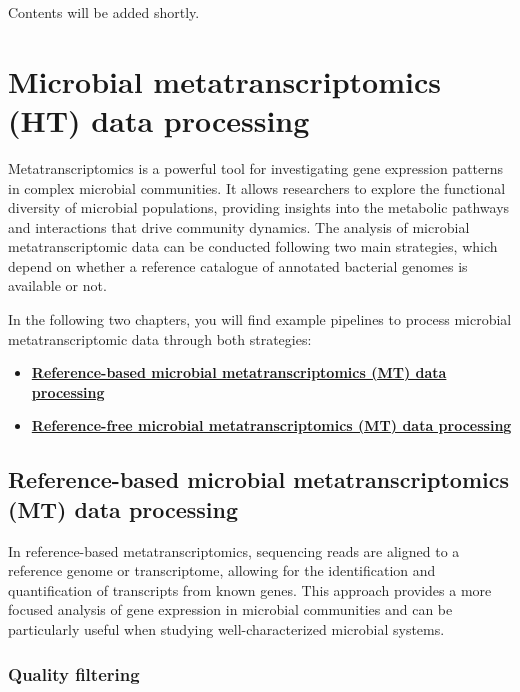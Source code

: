 \documentclass[
]{book}
\providecommand{\tightlist}{%
  \setlength{\itemsep}{0pt}\setlength{\parskip}{0pt}}
\begin{document}
Contents will be added shortly.

\hypertarget{microbial-metatranscriptomics-data-processing}{%
\chapter{Microbial metatranscriptomics (HT) data processing}\label{microbial-metatranscriptomics-data-processing}}

Metatranscriptomics is a powerful tool for investigating gene expression patterns in complex microbial communities. It allows researchers to explore the functional diversity of microbial populations, providing insights into the metabolic pathways and interactions that drive community dynamics. The analysis of microbial metatranscriptomic data can be conducted following two main strategies, which depend on whether a reference catalogue of annotated bacterial genomes is available or not.

In the following two chapters, you will find example pipelines to process microbial metatranscriptomic data through both strategies:

\begin{itemize}
\tightlist
\item
  \textbf{\protect\hyperlink{microbial-metatranscriptomics-data-processing-reference-based}{Reference-based microbial metatranscriptomics (MT) data processing}}
\item
  \textbf{\protect\hyperlink{microbial-metatranscriptomics-data-processing-reference-free}{Reference-free microbial metatranscriptomics (MT) data processing}}
\end{itemize}

\hypertarget{microbial-metatranscriptomics-data-processing-reference-based}{%
\section{Reference-based microbial metatranscriptomics (MT) data processing}\label{microbial-metatranscriptomics-data-processing-reference-based}}

In reference-based metatranscriptomics, sequencing reads are aligned to a reference genome or transcriptome, allowing for the identification and quantification of transcripts from known genes. This approach provides a more focused analysis of gene expression in microbial communities and can be particularly useful when studying well-characterized microbial systems.

\hypertarget{quality-filtering-1}{%
\subsection*{Quality filtering}\label{quality-filtering-1}}
\end{document}
